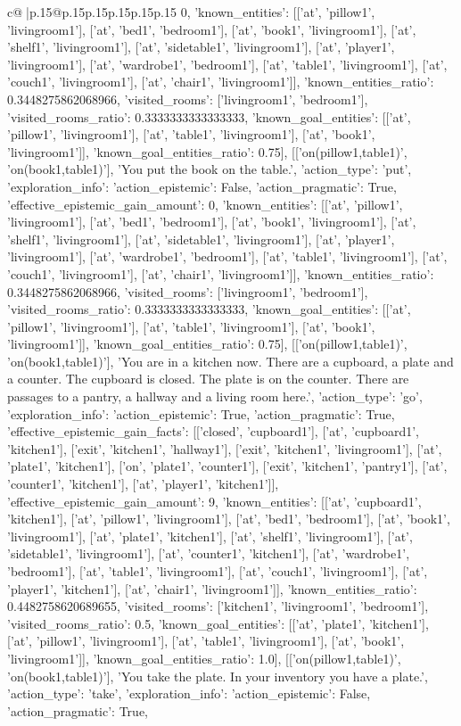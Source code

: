 \documentclass{article}
\begin{document}
{\begin{supertabular}{c@{$\;$}|p{.15\linewidth}@{}p{.15\linewidth}p{.15\linewidth}p{.15\linewidth}p{.15\linewidth}p{.15\linewidth}}
{{{0, 'known_entities': [['at', 'pillow1', 'livingroom1'], ['at', 'bed1', 'bedroom1'], ['at', 'book1', 'livingroom1'], ['at', 'shelf1', 'livingroom1'], ['at', 'sidetable1', 'livingroom1'], ['at', 'player1', 'livingroom1'], ['at', 'wardrobe1', 'bedroom1'], ['at', 'table1', 'livingroom1'], ['at', 'couch1', 'livingroom1'], ['at', 'chair1', 'livingroom1']], 'known_entities_ratio': 0.3448275862068966, 'visited_rooms': ['livingroom1', 'bedroom1'], 'visited_rooms_ratio': 0.3333333333333333, 'known_goal_entities': [['at', 'pillow1', 'livingroom1'], ['at', 'table1', 'livingroom1'], ['at', 'book1', 'livingroom1']], 'known_goal_entities_ratio': 0.75}}], [['on(pillow1,table1)', 'on(book1,table1)'], 'You put the book on the table.\n', {'action_type': 'put', 'exploration_info': {'action_epistemic': False, 'action_pragmatic': True, 'effective_epistemic_gain_amount': 0, 'known_entities': [['at', 'pillow1', 'livingroom1'], ['at', 'bed1', 'bedroom1'], ['at', 'book1', 'livingroom1'], ['at', 'shelf1', 'livingroom1'], ['at', 'sidetable1', 'livingroom1'], ['at', 'player1', 'livingroom1'], ['at', 'wardrobe1', 'bedroom1'], ['at', 'table1', 'livingroom1'], ['at', 'couch1', 'livingroom1'], ['at', 'chair1', 'livingroom1']], 'known_entities_ratio': 0.3448275862068966, 'visited_rooms': ['livingroom1', 'bedroom1'], 'visited_rooms_ratio': 0.3333333333333333, 'known_goal_entities': [['at', 'pillow1', 'livingroom1'], ['at', 'table1', 'livingroom1'], ['at', 'book1', 'livingroom1']], 'known_goal_entities_ratio': 0.75}}], [['on(pillow1,table1)', 'on(book1,table1)'], 'You are in a kitchen now. There are a cupboard, a plate and a counter. The cupboard is closed. The plate is on the counter. There are passages to a pantry, a hallway and a living room here.\n', {'action_type': 'go', 'exploration_info': {'action_epistemic': True, 'action_pragmatic': True, 'effective_epistemic_gain_facts': [['closed', 'cupboard1'], ['at', 'cupboard1', 'kitchen1'], ['exit', 'kitchen1', 'hallway1'], ['exit', 'kitchen1', 'livingroom1'], ['at', 'plate1', 'kitchen1'], ['on', 'plate1', 'counter1'], ['exit', 'kitchen1', 'pantry1'], ['at', 'counter1', 'kitchen1'], ['at', 'player1', 'kitchen1']], 'effective_epistemic_gain_amount': 9, 'known_entities': [['at', 'cupboard1', 'kitchen1'], ['at', 'pillow1', 'livingroom1'], ['at', 'bed1', 'bedroom1'], ['at', 'book1', 'livingroom1'], ['at', 'plate1', 'kitchen1'], ['at', 'shelf1', 'livingroom1'], ['at', 'sidetable1', 'livingroom1'], ['at', 'counter1', 'kitchen1'], ['at', 'wardrobe1', 'bedroom1'], ['at', 'table1', 'livingroom1'], ['at', 'couch1', 'livingroom1'], ['at', 'player1', 'kitchen1'], ['at', 'chair1', 'livingroom1']], 'known_entities_ratio': 0.4482758620689655, 'visited_rooms': ['kitchen1', 'livingroom1', 'bedroom1'], 'visited_rooms_ratio': 0.5, 'known_goal_entities': [['at', 'plate1', 'kitchen1'], ['at', 'pillow1', 'livingroom1'], ['at', 'table1', 'livingroom1'], ['at', 'book1', 'livingroom1']], 'known_goal_entities_ratio': 1.0}}], [['on(pillow1,table1)', 'on(book1,table1)'], 'You take the plate. In your inventory you have a plate.\n', {'action_type': 'take', 'exploration_info': {'action_epistemic': False, 'action_pragmatic': True, }}}
\end{supertabular}}
\end{document}
